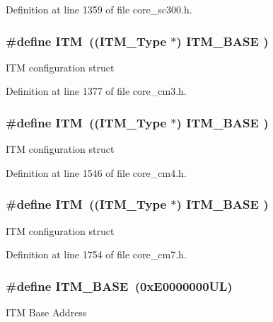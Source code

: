 Definition at line 1359 of file core\+\_\+sc300.\+h.

\subsubsection[{\texorpdfstring{I\+TM}{ITM}}]{\setlength{\rightskip}{0pt plus 5cm}\#define I\+TM~(({\bf I\+T\+M\+\_\+\+Type}       $\ast$)     {\bf I\+T\+M\+\_\+\+B\+A\+SE}      )}\hypertarget{group___c_m_s_i_s__core__base_gabae7cdf882def602cb787bb039ff6a43}{}\label{group___c_m_s_i_s__core__base_gabae7cdf882def602cb787bb039ff6a43}
I\+TM configuration struct 

Definition at line 1377 of file core\+\_\+cm3.\+h.

\subsubsection[{\texorpdfstring{I\+TM}{ITM}}]{\setlength{\rightskip}{0pt plus 5cm}\#define I\+TM~(({\bf I\+T\+M\+\_\+\+Type}       $\ast$)     {\bf I\+T\+M\+\_\+\+B\+A\+SE}      )}\hypertarget{group___c_m_s_i_s__core__base_gabae7cdf882def602cb787bb039ff6a43}{}\label{group___c_m_s_i_s__core__base_gabae7cdf882def602cb787bb039ff6a43}
I\+TM configuration struct 

Definition at line 1546 of file core\+\_\+cm4.\+h.

\subsubsection[{\texorpdfstring{I\+TM}{ITM}}]{\setlength{\rightskip}{0pt plus 5cm}\#define I\+TM~(({\bf I\+T\+M\+\_\+\+Type}       $\ast$)     {\bf I\+T\+M\+\_\+\+B\+A\+SE}      )}\hypertarget{group___c_m_s_i_s__core__base_gabae7cdf882def602cb787bb039ff6a43}{}\label{group___c_m_s_i_s__core__base_gabae7cdf882def602cb787bb039ff6a43}
I\+TM configuration struct 

Definition at line 1754 of file core\+\_\+cm7.\+h.

\subsubsection[{\texorpdfstring{I\+T\+M\+\_\+\+B\+A\+SE}{ITM_BASE}}]{\setlength{\rightskip}{0pt plus 5cm}\#define I\+T\+M\+\_\+\+B\+A\+SE~(0x\+E0000000\+U\+L)}\hypertarget{group___c_m_s_i_s__core__base_gadd76251e412a195ec0a8f47227a8359e}{}\label{group___c_m_s_i_s__core__base_gadd76251e412a195ec0a8f47227a8359e}
I\+TM Base Address 

